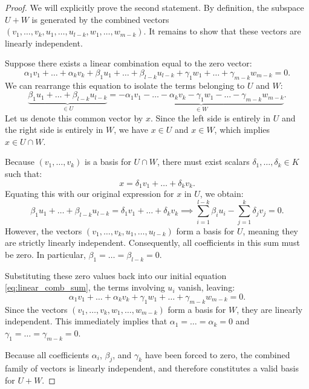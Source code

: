 \begin{proof}
We will explicitly prove the second statement. By definition, the subspace $U + W$ is generated by the combined vectors $(v_1, \dots, v_k, u_1, \dots, u_{l-k}, w_1, \dots, w_{m-k})$. It remains to show that these vectors are linearly independent.

Suppose there exists a linear combination equal to the zero vector:
\begin{equation}
\label{eq:linear_comb_sum}
\alpha_1 v_1 + \dots + \alpha_k v_k + \beta_1 u_1 + \dots + \beta_{l-k} u_{l-k} + \gamma_1 w_1 + \dots + \gamma_{m-k} w_{m-k} = 0.
\end{equation}
We can rearrange this equation to isolate the terms belonging to $U$ and $W$:
\[
\underbrace{\beta_1 u_1 + \dots + \beta_{l-k} u_{l-k}}_{\in U} = \underbrace{-\alpha_1 v_1 - \dots - \alpha_k v_k - \gamma_1 w_1 - \dots - \gamma_{m-k} w_{m-k}}_{\in W}.
\]
Let us denote this common vector by $x$. Since the left side is entirely in $U$ and the right side is entirely in $W$, we have $x \in U$ and $x \in W$, which implies $x \in U \cap W$. 

Because $(v_1, \dots, v_k)$ is a basis for $U \cap W$, there must exist scalars $\delta_1, \dots, \delta_k \in K$ such that:
\[
x = \delta_1 v_1 + \dots + \delta_k v_k.
\]
Equating this with our original expression for $x$ in $U$, we obtain:
\[
\beta_1 u_1 + \dots + \beta_{l-k} u_{l-k} = \delta_1 v_1 + \dots + \delta_k v_k \implies \sum_{i=1}^{l-k} \beta_i u_i - \sum_{j=1}^k \delta_j v_j = 0.
\]
However, the vectors $(v_1, \dots, v_k, u_1, \dots, u_{l-k})$ form a basis for $U$, meaning they are strictly linearly independent. Consequently, all coefficients in this sum must be zero. In particular, $\beta_1 = \dots = \beta_{l-k} = 0$.

Substituting these zero values back into our initial equation \eqref{eq:linear_comb_sum}, the terms involving $u_i$ vanish, leaving:
\[
\alpha_1 v_1 + \dots + \alpha_k v_k + \gamma_1 w_1 + \dots + \gamma_{m-k} w_{m-k} = 0.
\]
Since the vectors $(v_1, \dots, v_k, w_1, \dots, w_{m-k})$ form a basis for $W$, they are linearly independent. This immediately implies that $\alpha_1 = \dots = \alpha_k = 0$ and $\gamma_1 = \dots = \gamma_{m-k} = 0$. 

Because all coefficients $\alpha_i$, $\beta_j$, and $\gamma_k$ have been forced to zero, the combined family of vectors is linearly independent, and therefore constitutes a valid basis for $U + W$.
\end{proof}

